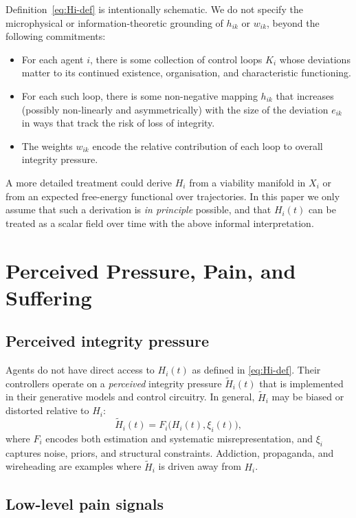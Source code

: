 \documentclass[11pt]{article}
\begin{document}
Definition~\eqref{eq:Hi-def} is intentionally schematic. We do not specify the microphysical or information-theoretic grounding of $h_{ik}$ or $w_{ik}$, beyond the following commitments:
\begin{itemize}
  \item For each agent $i$, there is some collection of control loops $K_i$ whose deviations matter to its continued existence, organisation, and characteristic functioning.
  \item For each such loop, there is some non-negative mapping $h_{ik}$ that increases (possibly non-linearly and asymmetrically) with the size of the deviation $e_{ik}$ in ways that track the risk of loss of integrity.
  \item The weights $w_{ik}$ encode the relative contribution of each loop to overall integrity pressure.
\end{itemize}

A more detailed treatment could derive $H_i$ from a viability manifold in $X_i$ or from an expected free-energy functional over trajectories. In this paper we only assume that such a derivation is \emph{in principle} possible, and that $H_i(t)$ can be treated as a scalar field over time with the above informal interpretation.

\section{Perceived Pressure, Pain, and Suffering}

\subsection{Perceived integrity pressure}

Agents do not have direct access to $H_i(t)$ as defined in \eqref{eq:Hi-def}. Their controllers operate on a \emph{perceived} integrity pressure $\tilde H_i(t)$ that is implemented in their generative models and control circuitry. In general, $\tilde H_i$ may be biased or distorted relative to $H_i$:
\begin{equation}
  \tilde H_i(t) = F_i\bigl(H_i(t), \xi_i(t)\bigr),
\end{equation}
where $F_i$ encodes both estimation and systematic misrepresentation, and $\xi_i$ captures noise, priors, and structural constraints. Addiction, propaganda, and wireheading are examples where $\tilde H_i$ is driven away from $H_i$.

\subsection{Low-level pain signals}
\end{document}
